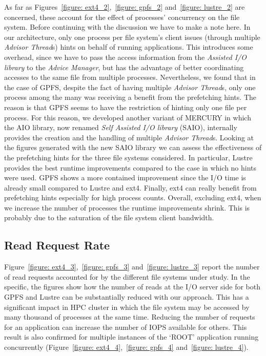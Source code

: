 As far as Figures~\ref{figure: ext4_2},~\ref{figure: gpfs_2} and~\ref{figure: lustre_2} are concerned, these account for the effect of processes' concurrency on the file system. Before continuing with the discussion we have to make a note here. In our architecture, only one process per file system's client issues (through multiple \textit{Advisor Thread}s) hints on behalf of running applications. This introduces some overhead, since we have to pass the access information from the \textit{Assisted I/O library} to the \textit{Advice Manager}, but has the advantage of better coordinating accesses to the same file from multiple processes. Nevertheless, we found that in the case of GPFS, despite the fact of having multiple \textit{Advisor Thread}s, only one process among the many was receiving a benefit from the prefetching hints. The reason is that GPFS seems to have the restriction of hinting only one file per process. For this reason, we developed another variant of MERCURY in which the AIO library, now renamed \textit{Self Assisted I/O library} (SAIO), internally provides the creation and the handling of multiple \textit{Advisor Thread}s. Looking at the figures generated with the new SAIO library we can assess the effectiveness of the prefetching hints for the three file systems considered. In particular, Lustre provides the best runtime improvements compared to the case in which no hints were used. GPFS shows a more contained improvement since the I/O time is already small compared to Lustre and ext4. Finally, ext4 can really benefit from prefetching hints especially for high process counts. Overall, excluding ext4, when we increase the number of processes the runtime improvements shrink. This is probably due to the saturation of the file system client bandwidth.

\subsection{Read Request Rate}
\label{subsec: reads}
Figure~\ref{figure: ext4_3},~\ref{figure: gpfs_3} and~\ref{figure: lustre_3} report the number of read requests accounted for by the different file systems under study. In the specific, the figures show how the number of reads at the I/O server side for both GPFS and Lustre can be substantially reduced with our approach. This has a significant impact in HPC cluster in which the file system may be accessed by many thousand of processes at the same time. Reducing the number of requests for an application can increase the number of IOPS available for others. This result is also confirmed for multiple instances of the `ROOT' application running concurrently (Figure~\ref{figure: ext4_4},~\ref{figure: gpfs_4} and~\ref{figure: lustre_4}).
